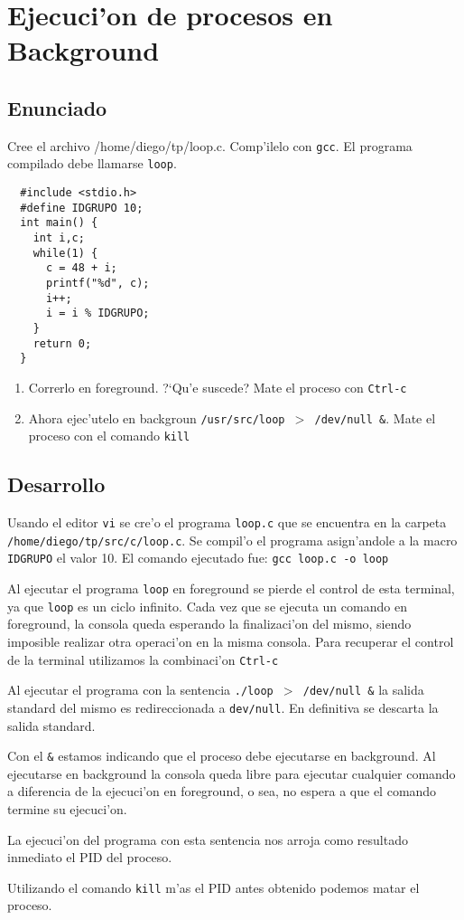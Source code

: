 \section{Ejecuci'on de procesos en Background}
\subsection{Enunciado}
Cree el archivo /home/diego/tp/loop.c. Comp'ilelo con \texttt{gcc}. El programa compilado debe llamarse \texttt{loop}. 
\begin{verbatim}
  #include <stdio.h>
  #define IDGRUPO 10;
  int main() {
    int i,c;
    while(1) {
      c = 48 + i;
      printf("%d", c);
      i++;
      i = i % IDGRUPO;
    }
    return 0;
  }
\end{verbatim}
\begin{enumerate}
\item Correrlo en foreground. ?`Qu'e suscede? Mate el proceso con \texttt{Ctrl-c}
\item Ahora ejec'utelo en backgroun \texttt{/usr/src/loop $>$ /dev/null \&}. Mate el proceso con el comando \texttt{kill}
\end{enumerate}
\subsection{Desarrollo}
Usando el editor \texttt{vi} se cre'o el programa \texttt{loop.c} que se encuentra en la carpeta \texttt{/home/diego/tp/src/c/loop.c}.
Se compil'o el programa asign'andole a la macro \texttt{IDGRUPO} el valor 10. El comando ejecutado fue: \texttt{gcc loop.c -o loop}

\begin{asparaenum}

\item Al ejecutar el programa \texttt{loop} en foreground se pierde el control de esta terminal, ya que \texttt{loop} es un ciclo infinito. Cada vez que se ejecuta un comando en foreground, la consola queda esperando la finalizaci'on del mismo, siendo imposible realizar otra operaci'on en la misma consola.
Para recuperar el control de la terminal utilizamos la combinaci'on \texttt{Ctrl-c}

\item Al ejecutar el programa con la sentencia \texttt{./loop $>$ /dev/null \&} la salida standard del mismo es redireccionada a \texttt{dev/null}. En definitiva se descarta la salida standard.

Con el \texttt{\&} estamos indicando que el proceso debe ejecutarse en background. Al ejecutarse en background la consola queda libre para ejecutar cualquier comando a diferencia de la ejecuci'on en foreground, o sea, no espera a que el comando termine su ejecuci'on.

La ejecuci'on del programa con esta sentencia nos arroja como resultado inmediato el PID del proceso.

Utilizando el comando \texttt{kill} m'as el PID antes obtenido podemos matar el proceso.
\end{asparaenum}
